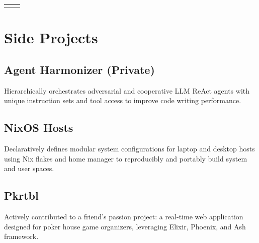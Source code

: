 \documentclass[
	10pt, %
]{FreemanCV}
\begin{document}
\begin{paracol}{2}
\begin{supertabular}{r l}







\end{supertabular}


\section{Side Projects}

\subsection{Agent Harmonizer (Private)}

Hierarchically orchestrates adversarial and cooperative LLM ReAct agents with unique instruction sets and tool access to improve code writing performance.

\subsection{NixOS Hosts}

Declaratively defines modular system configurations for laptop and desktop hosts using Nix flakes and home manager to reproducibly and portably build system and user spaces.

\subsection{Pkrtbl}

Actively contributed to a friend's passion project: a real-time web application designed for poker house game organizers, leveraging Elixir, Phoenix, and Ash framework.


\end{paracol}
\end{document}

